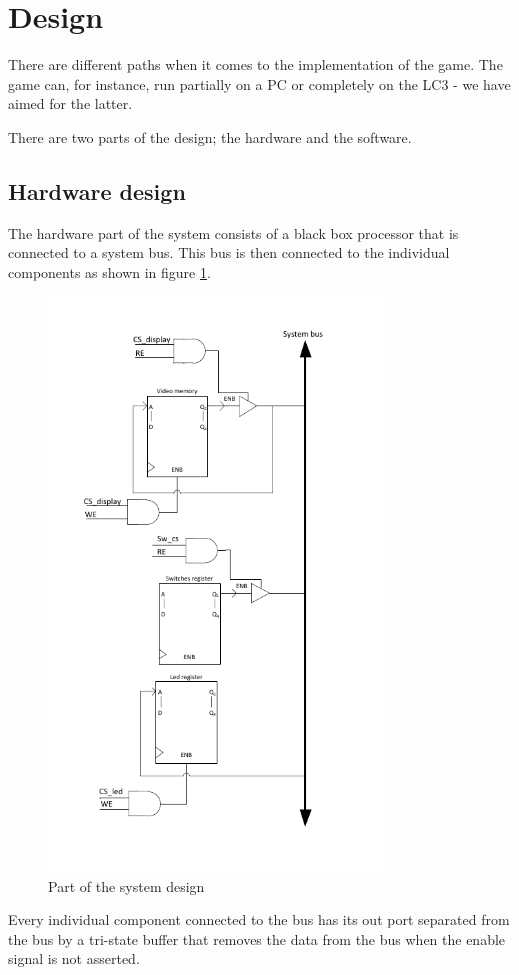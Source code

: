 \documentclass{acm_proc_article-sp}
\begin{document}

\section{Design}
There are different paths when it comes to the implementation of the game. The game can, for instance, run partially on a PC or completely on the LC3 - we have aimed for the latter.

There are two parts of the design; the hardware and the software.
\subsection{Hardware design}
The hardware part of the system consists of a black box processor that is connected to a system bus. This bus is then connected to the individual components as shown in figure \ref{fig:system}. 
\begin{figure}[h]
\centering
\includegraphics[width=3.5in]{fig/system.pdf}
\caption{Part of the system design}
\label{fig:system}
\end{figure}
Every individual component connected to the bus has its out port separated from the bus by a tri-state buffer that removes the data from the bus when the enable signal is not asserted.
\end{document}
